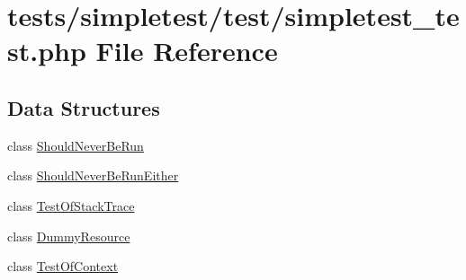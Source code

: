 \hypertarget{simpletest__test_8php}{\section{tests/simpletest/test/simpletest\-\_\-test.php File Reference}
\label{simpletest__test_8php}
}
\subsection*{Data Structures}
\begin{DoxyCompactItemize}
\item 
class \hyperlink{class_should_never_be_run}{Should\-Never\-Be\-Run}
\item 
class \hyperlink{class_should_never_be_run_either}{Should\-Never\-Be\-Run\-Either}
\item 
class \hyperlink{class_test_of_stack_trace}{Test\-Of\-Stack\-Trace}
\item 
class \hyperlink{class_dummy_resource}{Dummy\-Resource}
\item 
class \hyperlink{class_test_of_context}{Test\-Of\-Context}
\end{DoxyCompactItemize}
